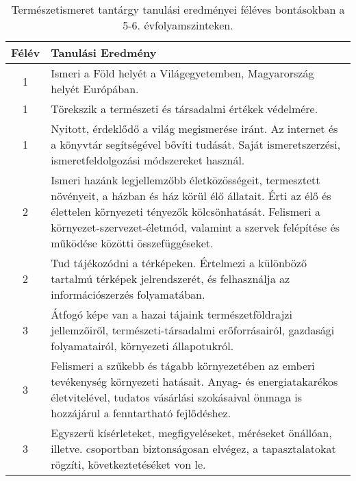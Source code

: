        
           \begin{longtable}{c | p{} }
            \caption[Természetismeret 5-6.]{Természetismeret tantárgy tanulási eredményei féléves bontásokban a 5-6. évfolyamszinteken. }  \\

            \textbf{Félév} & \textbf{Tanulási Eredmény} \\
            \hline
            \endhead
                                
                                          1 &  Ismeri a Föld helyét a Világegyetemben, Magyarország helyét Európában. \\ \hline
                                          1 &  Törekszik a természeti és társadalmi értékek védelmére. \\ \hline
                                          1 &  Nyitott, érdeklődő a világ megismerése iránt. Az internet és a könyvtár segítségével bővíti tudását. Saját ismeretszerzési, ismeretfeldolgozási módszereket használ. \\ \hline
                                      
                                
                                          2 &  Ismeri hazánk legjellemzőbb életközösségeit, termesztett növényeit, a házban és ház körül élő állatait. Érti az élő és élettelen környezeti tényezők kölcsönhatását. Felismeri a környezet-szervezet-életmód, valamint a szervek felépítése és működése közötti összefüggéseket. \\ \hline
                                          2 &  Tud tájékozódni a térképeken. Értelmezi a különböző tartalmú térképek jelrendszerét, és felhasználja az információszerzés folyamatában. \\ \hline
                                      
                                
                                          3 &  Átfogó képe van a hazai tájaink természetföldrajzi jellemzőiről, természeti-társadalmi erőforrásairól, gazdasági folyamatairól, környezeti állapotukról. \\ \hline
                                          3 &  Felismeri a szűkebb és tágabb környezetében az emberi tevékenység környezeti hatásait. Anyag- és energiatakarékos életvitelével, tudatos vásárlási szokásaival önmaga is hozzájárul a fenntartható fejlődéshez. \\ \hline
                                          3 &  Egyszerű kísérleteket, megfigyeléseket, méréseket önállóan, illetve. csoportban biztonságosan elvégez, a tapasztalatokat rögzíti, következtetéséket von le. \\ \hline
                                      

\end{longtable}
